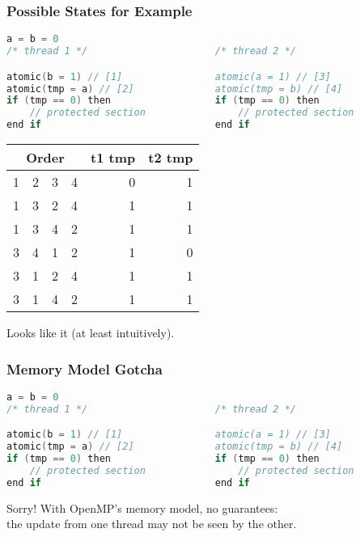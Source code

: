 \begin{frame}[fragile]
  \frametitle{Possible States for Example}

  \begin{lstlisting}[language=C,morekeywords={foreach,pragma,omp,parallel,single,nowait,task,untied,barrier,taskyield,mergeable,final,taskwait,critical}]
                    a = b = 0
/* thread 1 */                      /* thread 2 */

atomic(b = 1) // [1]                atomic(a = 1) // [3]
atomic(tmp = a) // [2]              atomic(tmp = b) // [4]
if (tmp == 0) then                  if (tmp == 0) then
    // protected section                // protected section
end if                              end if
  \end{lstlisting}

  \begin{center}
  \begin{tabular}{r r r r | r r}
    \multicolumn{4}{c|}{Order} & t1 tmp & t2 tmp\\
    \hline
    1 & 2 & 3 & 4 & 0 & 1\\
    1 & 3 & 2 & 4 & 1 & 1\\
    1 & 3 & 4 & 2 & 1 & 1\\
    3 & 4 & 1 & 2 & 1 & 0\\
    3 & 1 & 2 & 4 & 1 & 1\\
    3 & 1 & 4 & 2 & 1 & 1\\
  \end{tabular}
  \end{center}

  
    Looks like it (at least intuitively).
  
\end{frame}

\begin{frame}[fragile]
  \frametitle{Memory Model Gotcha}

  \begin{lstlisting}[language=C,morekeywords={foreach,pragma,omp,parallel,single,nowait,task,untied,barrier,taskyield,mergeable,final,taskwait,critical}]
                    a = b = 0
/* thread 1 */                      /* thread 2 */

atomic(b = 1) // [1]                atomic(a = 1) // [3]
atomic(tmp = a) // [2]              atomic(tmp = b) // [4]
if (tmp == 0) then                  if (tmp == 0) then
    // protected section                // protected section
end if                              end if
  \end{lstlisting}

  
    Sorry! With OpenMP's memory model, no guarantees:\\
    the update from one thread may not be seen by the other.
  
\end{frame}

